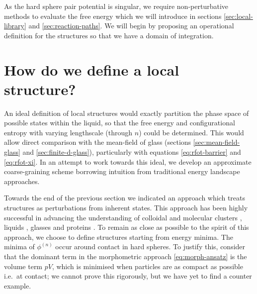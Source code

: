 \documentclass[11pt,twoside]{report}
\begin{document}
As the hard sphere pair potential is singular, we require non-perturbative methods to evaluate the free energy which we will introduce in sections \ref{sec:local-library} and \ref{sec:reaction-paths}.
We will begin by proposing an operational definition for the structures so that we have a domain of integration.

\section{How do we define a local structure?}
\label{sec:structure-definition}

An ideal definition of local structures would exactly partition the phase space of possible states within the liquid, so that the free energy and configurational entropy with varying lengthscale (through $n$) could be determined.
This would allow direct comparison with the mean-field of glass (sections \ref{sec:mean-field-glass} and \ref{sec:finite-d-glass}), particularly with equations \eqref{eq:rfot-barrier} and \eqref{eq:rfot-xi}.
In an attempt to work towards this ideal, we develop an approximate coarse-graining scheme borrowing intuition from traditional energy landscape approaches.

Towards the end of the previous section we indicated an approach which treats structures as perturbations from inherent states.
This approach has been highly successful in advancing the understanding of colloidal and molecular clusters \cite{WalesJCP1994,DoyePRB2001}, liquids \cite{DoyeJCP1995,DoyeJPB1996,StillingerPRA1982}, glasses \cite{WalesN1998,StillingerS1995} and proteins \cite{Wales2004}.
To remain as close as possible to the spirit of this approach, we choose to define structures starting from energy minima.
The minima of $\phi^{(n)}$ occur around contact in hard spheres.
To justify this, consider that the dominant term in the morphometric approach \eqref{eq:morph-ansatz} is the volume term $pV$, which is minimised when particles are as compact as possible i.e.\ at contact; we cannot prove this rigorously, but we have yet to find a counter example.
\end{document}

